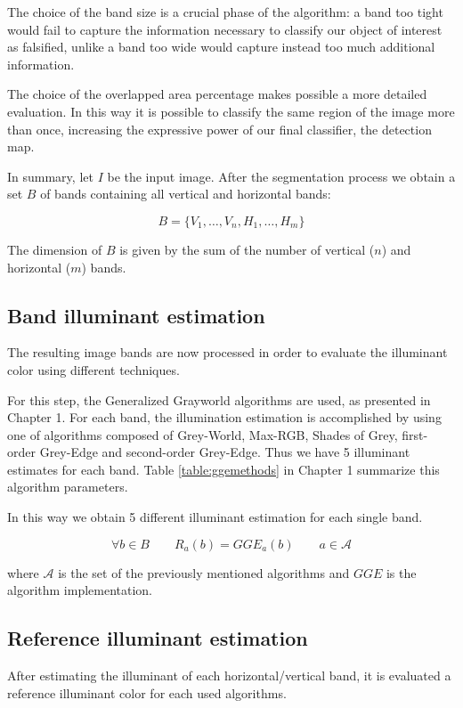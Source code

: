 The choice of the band size is a crucial phase of the algorithm: a band too tight would fail to capture the information necessary to classify our object of interest as falsified, unlike a band too wide would capture instead too much additional information.

The choice of the overlapped area percentage makes possible a more detailed evaluation. In this way it is possible to classify the same region of the image more than once, increasing the expressive power of our final classifier, the detection map.
 
In summary, let $I$ be the input image. After the segmentation process we obtain a set $B$ of bands containing all vertical and horizontal bands:

$$
B = \{V_1, \ldots, V_n, H_1, \ldots, H_m\}
$$

The dimension of $B$ is given by the sum of the number of vertical ($n$) and horizontal ($m$) bands.

\subsection{Band illuminant estimation}

The resulting image bands are now processed in order to evaluate the illuminant color using different techniques.

For this step, the Generalized Grayworld \cite{van2007edge} algorithms are used, as presented in Chapter 1. For each band, the illumination estimation is accomplished by using one of algorithms composed of Grey-World, Max-RGB, Shades of Grey, first-order Grey-Edge and second-order Grey-Edge. Thus we have 5 illuminant estimates for each band.
Table \ref{table:ggemethods} in Chapter 1 summarize this algorithm parameters.

In this way we obtain 5 different illuminant estimation for each single band.

$$
\forall b \in B \qquad R_a(b) = GGE_a(b) \qquad a \in \mathcal{A}
$$

where $\mathcal{A}$ is the set of the previously mentioned algorithms and $GGE$ is the algorithm implementation.

\subsection{Reference illuminant estimation}

After estimating the illuminant of each horizontal/vertical band, it is evaluated a reference illuminant color for each used algorithms.

